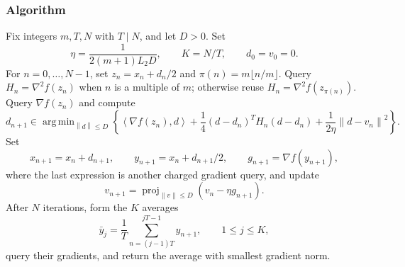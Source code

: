 \documentclass[11pt]{article}
\theoremstyle{remark}
\theoremstyle{remark}
\newcommand{\norm}[1]{\left\lVert#1\right\rVert}
\newcommand{\ip}[2]{\left\langle#1,#2\right\rangle}
\newcommand{\proj}{\operatorname{proj}}
\DeclareMathOperator*{\argmin}{arg\,min}
\begin{document}
\subsubsection{Algorithm}
Fix integers $m,T,N$ with $T\mid N$, and let $D>0$. Set
\[
 \eta=\frac{1}{2(m+1)L_2D},\qquad K=N/T,\qquad d_0=v_0=0.
\]
For $n=0,\ldots,N-1$, set $z_n=x_n+d_n/2$ and $\pi(n)=m\lfloor n/m\rfloor$. Query $H_n=\nabla^2f(z_n)$ when $n$ is a multiple of $m$; otherwise reuse $H_n=\nabla^2f(z_{\pi(n)})$. Query $\nabla f(z_n)$ and compute
\begin{equation}\label{eq:lazy-step}
 d_{n+1}\in\argmin_{\norm{d}\le D}
 \left\{\ip{\nabla f(z_n)}{d}
 +\frac14(d-d_n)^TH_n(d-d_n)
 +\frac{1}{2\eta}\norm{d-v_n}^2\right\}.
\end{equation}
Set
\[
 x_{n+1}=x_n+d_{n+1},\qquad y_{n+1}=x_n+d_{n+1}/2,
 \qquad g_{n+1}=\nabla f(y_{n+1}),
\]
where the last expression is another charged gradient query, and update
\[
 v_{n+1}=\proj_{\norm{v}\le D}(v_n-\eta g_{n+1}).
\]
After $N$ iterations, form the $K$ averages
\[
 \bar y_j=\frac1T\sum_{n=(j-1)T}^{jT-1}y_{n+1},\qquad 1\le j\le K,
\]
query their gradients, and return the average with smallest gradient norm.
\end{document}
